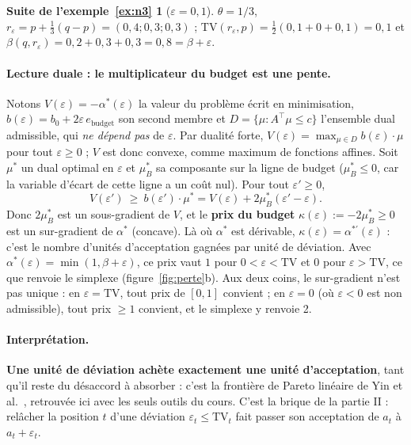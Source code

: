 \documentclass[11pt,a4paper]{article}
\newcommand{\TV}{\mathrm{TV}}
\theoremstyle{plain}
\theoremstyle{definition}
\newtheorem*{suite}{Suite de l'exemple~\ref{ex:n3}}
\begin{document}
\begin{suite}[$\varepsilon=0{,}1$]
$\theta=1/3$, $r_\varepsilon=p+\tfrac13(q-p)=(0{,}4;0{,}3;0{,}3)$ ; $\TV(r_\varepsilon,p)=\tfrac12(0{,}1+0+0{,}1)=0{,}1$ et $\beta(q,r_\varepsilon)=0{,}2+0{,}3+0{,}3=0{,}8=\beta+\varepsilon$.
\end{suite}

\paragraph{Lecture duale : le multiplicateur du budget est une pente.} Notons $V(\varepsilon)=-\alpha^*(\varepsilon)$ la valeur du problème écrit en minimisation, $b(\varepsilon)=b_0+2\varepsilon\,e_{\text{budget}}$ son second membre et $D=\{\mu:A^\top\mu\le c\}$ l'ensemble dual admissible, qui \emph{ne dépend pas} de $\varepsilon$. Par dualité forte, $V(\varepsilon)=\max_{\mu\in D}b(\varepsilon)\cdot\mu$ pour tout $\varepsilon\ge0$ ; $V$ est donc convexe, comme maximum de fonctions affines. Soit $\mu^*$ un dual optimal en $\varepsilon$ et $\mu^*_B$ sa composante sur la ligne de budget ($\mu^*_B\le0$, car la variable d'écart de cette ligne a un coût nul). Pour tout $\varepsilon'\ge0$,
\[V(\varepsilon')\ \ge\ b(\varepsilon')\cdot\mu^*=V(\varepsilon)+2\mu^*_B(\varepsilon'-\varepsilon).\]
Donc $2\mu^*_B$ est un sous-gradient de $V$, et le \textbf{prix du budget} $\kappa(\varepsilon):=-2\mu^*_B\ge0$ est un sur-gradient de $\alpha^*$ (concave). Là où $\alpha^*$ est dérivable, $\kappa(\varepsilon)=\alpha^{*\prime}(\varepsilon)$ : c'est le nombre d'unités d'acceptation gagnées par unité de déviation. Avec $\alpha^*(\varepsilon)=\min(1,\beta+\varepsilon)$, ce prix vaut $1$ pour $0<\varepsilon<\TV$ et $0$ pour $\varepsilon>\TV$, ce que renvoie le simplexe (figure~\ref{fig:perte}b). Aux deux coins, le sur-gradient n'est pas unique : en $\varepsilon=\TV$, tout prix de $[0,1]$ convient ; en $\varepsilon=0$ (où $\varepsilon<0$ est non admissible), tout prix $\ge1$ convient, et le simplexe y renvoie 2.

\paragraph{Interprétation.} \textbf{Une unité de déviation achète exactement une unité d'acceptation}, tant qu'il reste du désaccord à absorber : c'est la frontière de Pareto linéaire de Yin et al.~\cite{yin}, retrouvée ici avec les seuls outils du cours. C'est la brique de la partie II : relâcher la position $t$ d'une déviation $\varepsilon_t\le\TV_t$ fait passer son acceptation de $a_t$ à $a_t+\varepsilon_t$.
\end{document}

